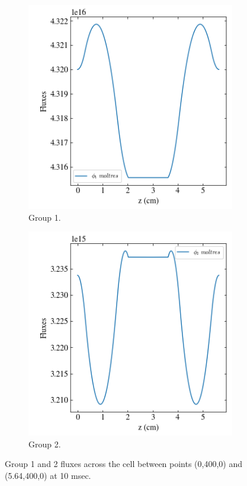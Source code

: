 \documentclass[11pt,letterpaper]{article}
\begin{document}
	\begin{figure}[htbp!]
		\centering
		\begin{subfigure}[t]{0.4\textwidth}
			\centering
			\includegraphics[width=\linewidth]{2D-unitcell-reflec-action3}
			\caption{Group 1.}
		\end{subfigure}
		\begin{subfigure}[t]{0.4\textwidth}
			\centering
			\includegraphics[width=\linewidth]{2D-unitcell-reflec-action4}
			\caption{Group 2.}
		\end{subfigure}
		\hfill
		\caption{Group 1 and 2 fluxes across the cell between points (0,400,0) and (5.64,400,0) at 10 msec.}
		\label{fig:2D-unitcell-reflec2}
	\end{figure}
\end{document}
